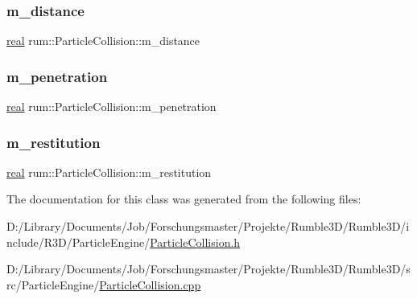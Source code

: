 \subsubsection{\texorpdfstring{m\+\_\+distance}{m\_distance}}
{\footnotesize\ttfamily \mbox{\hyperlink{namespacerum_a7e8cca23573d5eaead0f138cbaa4862c}{real}} rum\+::\+Particle\+Collision\+::m\+\_\+distance\hspace{0.3cm}{\ttfamily [protected]}}

\mbox{\label{classrum_1_1_particle_collision_a9ad398fd1a7b78e8ae8083610be60abb}} 
\subsubsection{\texorpdfstring{m\+\_\+penetration}{m\_penetration}}
{\footnotesize\ttfamily \mbox{\hyperlink{namespacerum_a7e8cca23573d5eaead0f138cbaa4862c}{real}} rum\+::\+Particle\+Collision\+::m\+\_\+penetration\hspace{0.3cm}{\ttfamily [protected]}}

\mbox{\label{classrum_1_1_particle_collision_ae7aca9af657f5aea5e5e8c1261a51569}} 
\subsubsection{\texorpdfstring{m\+\_\+restitution}{m\_restitution}}
{\footnotesize\ttfamily \mbox{\hyperlink{namespacerum_a7e8cca23573d5eaead0f138cbaa4862c}{real}} rum\+::\+Particle\+Collision\+::m\+\_\+restitution\hspace{0.3cm}{\ttfamily [protected]}}



The documentation for this class was generated from the following files\+:\begin{DoxyCompactItemize}
\item 
D\+:/\+Library/\+Documents/\+Job/\+Forschungsmaster/\+Projekte/\+Rumble3\+D/\+Rumble3\+D/include/\+R3\+D/\+Particle\+Engine/\mbox{\hyperlink{_particle_collision_8h}{Particle\+Collision.\+h}}\item 
D\+:/\+Library/\+Documents/\+Job/\+Forschungsmaster/\+Projekte/\+Rumble3\+D/\+Rumble3\+D/src/\+Particle\+Engine/\mbox{\hyperlink{_particle_collision_8cpp}{Particle\+Collision.\+cpp}}\end{DoxyCompactItemize}
